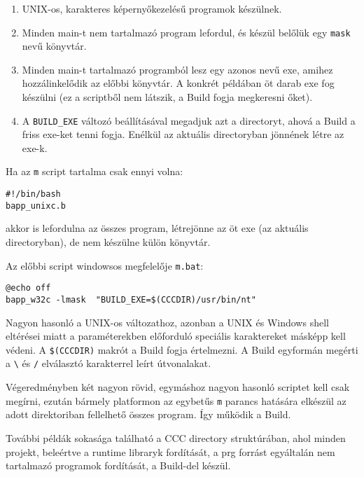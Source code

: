 \begin{enumerate}
\item 
   UNIX-os, karakteres képernyőkezelésű programok készülnek.
\item 
   Minden main-t nem tartalmazó program lefordul, és készül belőlük
   egy \verb!mask! nevű könyvtár.
\item 
   Minden main-t tartalmazó programból lesz egy azonos nevű exe,
   amihez hozzálinkelődik az előbbi könyvtár. A konkrét példában
   öt darab exe fog készülni (ez a scriptből nem látszik,
   a Build fogja megkeresni őket).
\item
   A \verb!BUILD_EXE! változó beállításával megadjuk azt a directoryt,
   ahová a Build a friss exe-ket tenni fogja. Enélkül az aktuális
   directoryban jönnének létre az exe-k.
\end{enumerate}

Ha az \verb!m! script tartalma csak ennyi volna:
\begin{verbatim}
#!/bin/bash
bapp_unixc.b
\end{verbatim}
akkor is lefordulna az összes program, létrejönne az öt exe
(az aktuális directoryban), de nem készülne külön könyvtár.

Az előbbi script windowsos megfelelője \verb!m.bat!:

\begin{verbatim}
@echo off
bapp_w32c -lmask  "BUILD_EXE=$(CCCDIR)/usr/bin/nt"
\end{verbatim}

Nagyon hasonló a UNIX-os változathoz, azonban a UNIX
és Windows shell eltérései miatt a paraméterekben 
előforduló speciális karaktereket másképp kell védeni.
A \verb!$(CCCDIR)! makrót a Build fogja értelmezni.
A Build egyformán megérti a \verb!\!  és \verb!/! 
elválasztó karakterrel leírt útvonalakat.

Végeredményben két nagyon rövid, egymáshoz nagyon hasonló scriptet 
kell csak megírni, ezután bármely platformon  az egybetűs \verb!m! 
parancs hatására elkészül az adott direktoriban fellelhető 
összes program. Így működik a Build.

További példák sokasága található a CCC directory struktúrában,
ahol  minden projekt, beleértve a runtime libraryk fordítását, 
a prg forrást egyáltalán nem tartalmazó programok fordítását,
a Build-del készül. 
 

 
 